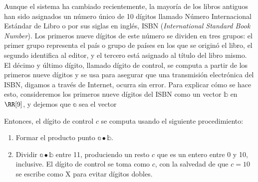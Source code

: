 \begin{adjustwidth}{-7.6cm}{-2cm}
    \begin{tcolorbox}[
        theorem style=change break,
        enhanced,
        breakable,
        boxrule=0pt,
        frame hidden,
        left = 1.8cm,
        right = 1.8cm,
        top=4mm,
        bottom=2mm,
        colback=black!7!white,
        coltitle=black,
        attach title to upper={\ },
        sharp corners,
        borderline north={1.5pt}{0pt}{black},
        title = {Aplicación del producto punto a números ISBN},
        fonttitle=\selectfont\Lato\bfseries\LARGE,
        fontupper=\normalsize
    ]
        \begin{multicols}{2}
            Aunque el sistema ha cambiado recientemente, la mayoría de los libros antiguos han sido asignados un número único de 10 dígitos llamado Número Internacional Estándar de Libro o por sus siglas en inglés, ISBN (\emph{International Standard Book Number}). Los primeros nueve dígitos de este número se dividen en tres grupos: el primer grupo representa el país o grupo de países en los que se originó el libro, el segundo identifica al editor, y el tercero está asignado al título del libro mismo. El décimo y último dígito, llamado dígito de control, se computa a partir de los primeros nueve dígitos y se usa para asegurar que una transmisión electrónica del ISBN, digamos a través de Internet, ocurra sin error. Para explicar cómo se hace esto, consideremos los primeros nueve dígitos del ISBN como un vector $\mathbb{b}$ en $\RR[9]$, y dejemos que $\mathbb{a}$ sea el vector
            \begin{matrizn}
            \end{matrizn}
            Entonces, el dígito de control $c$ se computa usando el siguiente procedimiento:\vspace{0.3cm}
            \begin{enumerate}[label=\roman*)]
                \item Formar el producto punto $\mathbb{a} \bullet \mathbb{b}$.
                \item Dividir $\mathbb{a} \bullet \mathbb{b}$ entre 11, produciendo un resto $c$ que es un entero entre 0 y 10, inclusive. El dígito de control se toma como $c$, con la salvedad de que $c = 10$ se escribe como X para evitar dígitos dobles.\vspace{0.3cm}

\end{enumerate}
\end{multicols}
\end{tcolorbox}
\end{adjustwidth}

